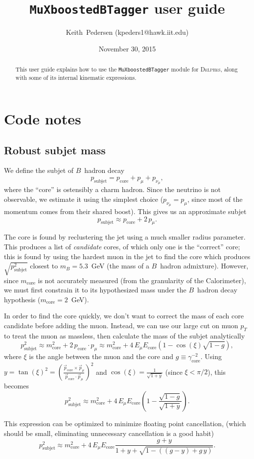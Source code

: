 \documentclass{article}
\newcommand{\muXmod}{\texttt{MuXboostedBTagger}}
\newcommand{\delphes}{\textsc{Delphes}}
\newcommand{\pT}{p_{T}^{}}
\newcommand{\pSubjet}[1][] {p_{\mathrm{subjet}}^{#1}}
\newcommand{\pCore}[1][]   {p_{\mathrm{core}}^{#1}}
\newcommand{\pCoreV}       {\vec{p}_{\mathrm{core}}^{}}
\newcommand{\pMu}[1][]     {p_{\mu}^{#1}}
\newcommand{\pMuV}       {\vec{p}_{\mu}^{}}
\newcommand{\pNu}[1][]     {p_{\nu_{\mu}}^{#1}}
\newcommand{\mB}             {m_{B}^{}}
\newcommand{\mCore}[1][]     {m_{\mathrm{core}}^{#1}}
\newcommand{\ECore}[1][]     {E_{\mathrm{core}}^{#1}}
\newcommand{\gammaCore}[1][] {\gamma_{\mathrm{core}}^{#1}}
\newcommand{\EMu}[1][]       {E_{\mu}^{#1}}
\begin{document}
\title{{\muXmod} user guide}

\author{Keith~Pedersen (kpeders1@hawk.iit.edu)}

\date{November 30, 2015}

\maketitle

\begin{abstract}
This user guide explains how to use the {\muXmod} module for {\delphes}, along with 
some of its internal kinematic expressions.
\end{abstract}

\section{Code notes}
\subsection{Robust subjet mass}
We define the subjet of $B$~hadron decay
%
\begin{equation}
\pSubjet=\pCore+\pMu+\pNu,
\end{equation}
%
where the ``core'' is ostensibly a charm hadron. 
Since the neutrino is not observable, we estimate it using the 
simplest choice ($\pNu=\pMu$, since most of the momentum comes from
their shared boost). This gives us an approximate subjet
%
\begin{equation}
\pSubjet\approx\pCore+2\,\pMu.
\end{equation}
%

The core is found by reclustering the jet using a much smaller radius 
parameter. This produces a list of \emph{candidate} cores, of which only
one is the ``correct'' core; this is found by using the hardest muon in 
the jet to find the core which produces $\sqrt{\pSubjet[2]}$ closest to 
$\mB=5.3$~GeV (the mass of a $B$~hadron admixture). 
However, since $\mCore$ is not accurately measured 
(from the granularity of the Calorimeter), we must first constrain it to its 
hypothesized mass under the $B$~hadron decay hypothesis ($\mCore=2$~GeV).

In order to find the core quickly, we don't want to correct the mass 
of each core candidate before adding the muon. Instead, we can use our
large cut on muon $\pT$ to treat the muon as massless, then calculate
the mass of the subjet analytically
%
\begin{equation}
\pSubjet[2]\approx\mCore[2]+2\,\pCore\cdot\pMu\approx\mCore[2]+4\,\EMu\ECore(1-\cos(\xi)\sqrt{1-g}),
\end{equation}
%
where $\xi$ is the angle between the muon and the core and $g\equiv\gammaCore[-2]$.
Using $y=\tan(\xi)^2=\left(\frac{\pCoreV\times\pMuV}{\pCoreV\cdot\pMuV}\right)^2$ 
and $\cos(\xi)=\frac{1}{\sqrt{1+y}}$ (since $\xi<\pi/2$), this becomes
%
\begin{equation}
\pSubjet[2]\approx\mCore[2]+4\,\EMu\ECore(1-\frac{\sqrt{1-g}}{\sqrt{1+y}}).
\end{equation}
%

This expression can be optimized to minimize floating point cancellation,
(which should be small, eliminating unnecessary
 cancellation is a good habit)
%
\begin{equation}
\pSubjet[2]\approx\mCore[2]+4\,\EMu\ECore\frac{g+y}{1+y+\sqrt{1-((g-y)+g\,y)}}.
\end{equation}
\end{document}
